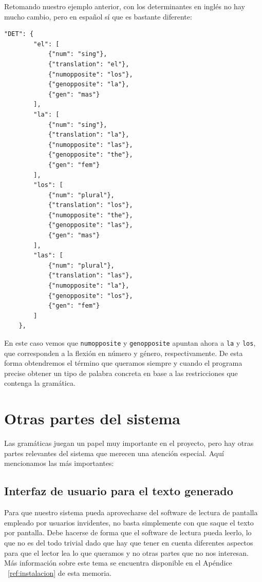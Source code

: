 Retomando nuestro ejemplo anterior, con los determinantes en inglés no hay mucho cambio, pero en español sí que es bastante diferente:

\begin{lstlisting}[style=json]
"DET": {
        "el": [
            {"num": "sing"},
            {"translation": "el"},
            {"numopposite": "los"},
            {"genopposite": "la"},
            {"gen": "mas"}
        ],
        "la": [
            {"num": "sing"},
            {"translation": "la"},
            {"numopposite": "las"},
            {"genopposite": "the"},
            {"gen": "fem"}
        ],
        "los": [
            {"num": "plural"},
            {"translation": "los"},
            {"numopposite": "the"},
            {"genopposite": "las"},
            {"gen": "mas"}
        ],
        "las": [
            {"num": "plural"},
            {"translation": "las"},
            {"numopposite": "la"},
            {"genopposite": "los"},
            {"gen": "fem"}
        ]
    },
\end{lstlisting}

\noindent En este caso vemos que \texttt{numopposite} y \texttt{genopposite} apuntan ahora a \texttt{la} y \texttt{los}, que corresponden a la flexión en número y género, respectivamente. De esta forma  obtendremos el término que queramos siempre y cuando el programa precise obtener un tipo de palabra concreta en base a las restricciones que contenga la gramática.

\section{Otras partes del sistema}

Las gramáticas juegan un papel muy importante en el proyecto, pero hay otras partes relevantes del sistema que merecen una atención especial. Aquí mencionamos las más importantes:

\subsection{Interfaz de usuario para el texto generado}

Para que nuestro sistema pueda aprovecharse del software de lectura de pantalla empleado por usuarios invidentes, no basta simplemente con que saque el texto por pantalla. Debe hacerse de forma que el software de lectura pueda leerlo, lo que no es del todo trivial dado que hay que tener en cuenta diferentes aspectos para que el lector lea lo que queramos y no otras partes que no nos interesan. Más información sobre este tema se encuentra disponible en el Apéndice ~\ref{ref:instalacion} de esta memoria.

